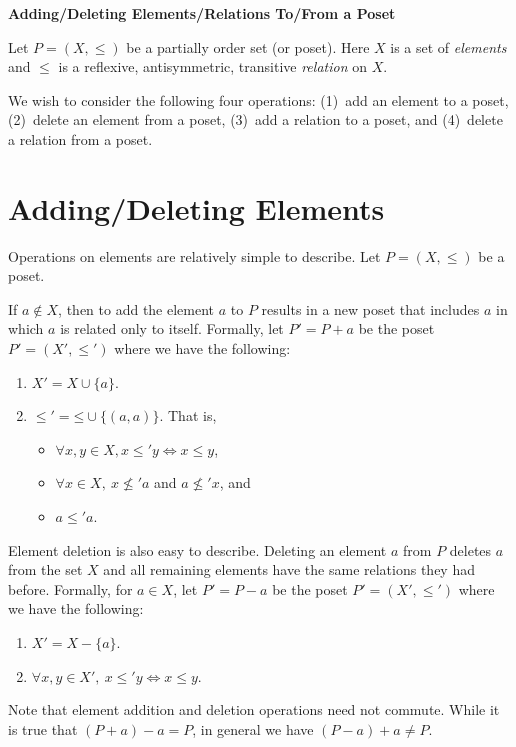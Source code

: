 \documentclass[12pt]{amsart}
\begin{document}
\begin{center}
  \textbf{Adding/Deleting Elements/Relations To/From a Poset}
\end{center}

Let $P=(X,\le)$ be a partially order set (or poset). Here $X$ is a set
of \emph{elements} and $\le$ is a reflexive, antisymmetric, transitive
\emph{relation} on $X$.

We wish to consider the following four operations: (1)~add an element
to a poset, (2)~delete an element from a poset, (3)~add a relation
to a poset, and (4)~delete a relation from a poset. 

\section*{Adding/Deleting Elements}

Operations on elements are relatively simple to describe. Let
$P=(X,\le)$ be a poset. 

If $a\notin X$, then to add the element $a$ to $P$ results in a new
poset that includes $a$ in which $a$ is related only to
itself. Formally, let $P'= P+a$ be the poset $P'=(X',\le')$ where we
have the following:
\begin{enumerate}
\item $X' = X \cup \{a\}$.
\item $\mathord{\le'} = \mathord{\le} \cup \{(a,a)\}$. That is, 
  \begin{itemize}
  \item $\forall x,y \in X, x\le'y\iff x\le y$,
  \item $\forall x \in X,\ x\not\le'a$ and $a \not\le' x$, and
  \item $a\le' a$.
  \end{itemize}
\end{enumerate}

Element deletion is also easy to describe. Deleting an element $a$
from $P$ deletes $a$ from the set $X$ and all remaining elements have
the same relations they had before. Formally, for $a \in X$, let
$P'=P-a$ be the poset $P'=(X',\le')$ where we have the following:
\begin{enumerate}
\item $X' = X - \{a\}$.
\item $\forall x,y \in X',\ x \le' y \iff x\le y$.
\end{enumerate}

Note that element addition and deletion operations need not
commute. While it is true that $(P+a)-a=P$, in general we have
$(P-a)+a\not=P$. 
\end{document}

